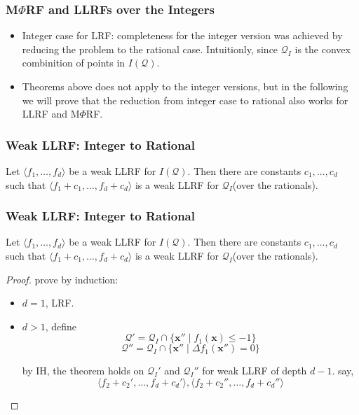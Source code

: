 \documentclass[11pt]{beamer}
\newif\ifcomm\commfalse
\begin{document}
\begin{frame}\frametitle{M$\Phi$RF and LLRFs over the Integers}

\begin{itemize}
\item Integer case for LRF: completeness for the integer version was achieved by reducing the problem to the rational case. Intuitionly, since $\mathcal{Q}_I$ is the convex combinition of points in $I(\mathcal{Q})$.

\item Theorems above does not apply to the integer versions, but in the following we will prove that the reduction from integer case to rational also works for LLRF and M$\Phi$RF.
\end{itemize}


\end{frame}
\fi

\begin{frame}\frametitle{Weak LLRF: Integer to Rational}
\begin{theorem}[4]

Let $\langle f_1, \ldots, f_d\rangle$ be a weak LLRF for $I(\mathcal{Q})$. Then there are constants $c_1, \ldots, c_d$ such that $\langle f_1 + c_1, \ldots, f_d + c_d\rangle$ is a weak LLRF for $\mathcal{Q}_I$(over the rationals).

\end{theorem}

\end{frame}
\ifcomm
\begin{frame}\frametitle{Weak LLRF: Integer to Rational}
\begin{theorem}[4]

Let $\langle f_1, \ldots, f_d\rangle$ be a weak LLRF for $I(\mathcal{Q})$. Then there are constants $c_1, \ldots, c_d$ such that $\langle f_1 + c_1, \ldots, f_d + c_d\rangle$ is a weak LLRF for $\mathcal{Q}_I$(over the rationals).

\end{theorem}


\begin{proof}
prove by induction:

\begin{itemize}
\item $d = 1$, LRF.
\item $d > 1$, define 
\[\mathcal{Q}' = \mathcal{Q}_I\cap \{\textbf{x}''\mid f_1(\textbf{x}) \le -1\}\]
\[\mathcal{Q}'' = \mathcal{Q}_I \cap \{\textbf{x}''\mid \Delta f_1(\textbf{x}'') = 0\}\]

by IH, the theorem holds on $\mathcal{Q}_I'$ and $\mathcal{Q}_I''$ for weak LLRF of depth $d - 1$. say,
\[\langle f_2 + c_2', \ldots, f_d + c_d'\rangle, \langle f_2 + c_2'', \ldots, f_d + c_d''\rangle\]
\end{itemize}

\end{proof}
\end{frame}
\end{document}
